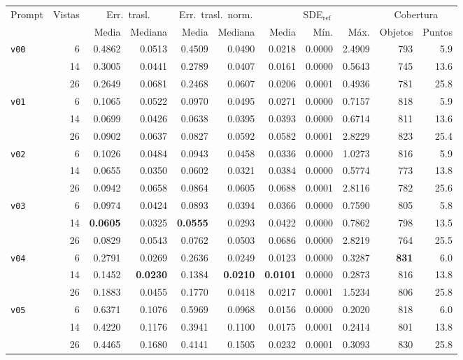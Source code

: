 \begin{table}[!h]
\vspace{2ex}

\begin{tabular*}{\textwidth}{@{\extracolsep{\fill}}lrrrrrrrrrr@{}}
\toprule
\multirow{2}{*}{Prompt} & \multirow{2}{*}{Vistas} & \multicolumn{2}{c}{Err.\ trasl.} & \multicolumn{2}{c}{Err.\ trasl.\ norm.} & \multicolumn{3}{c}{SDE$_{\mathrm{ref}}$} & \multicolumn{2}{c}{Cobertura} \\
\cmidrule(lr){3-4} \cmidrule(lr){5-6} \cmidrule(lr){7-9} \cmidrule(lr){10-11}
 &  & Media & Mediana & Media & Mediana & Media & Mín. & Máx. & Objetos & Puntos \\
\midrule
\multirow{3}{*}{\texttt{v00}} & 6 & 0.4862 & 0.0513 & 0.4509 & 0.0490 & 0.0218 & 0.0000 & 2.4909 & 793 & 5.9 \\
 & 14 & 0.3005 & 0.0441 & 0.2789 & 0.0407 & 0.0161 & 0.0000 & 0.5643 & 745 & 13.6 \\
 & 26 & 0.2649 & 0.0681 & 0.2468 & 0.0607 & 0.0206 & 0.0001 & 0.4936 & 781 & 25.8 \\
\midrule
\multirow{3}{*}{\texttt{v01}} & 6 & 0.1065 & 0.0522 & 0.0970 & 0.0495 & 0.0271 & 0.0000 & 0.7157 & 818 & 5.9 \\
 & 14 & 0.0699 & 0.0426 & 0.0638 & 0.0395 & 0.0393 & 0.0000 & 0.6714 & 811 & 13.6 \\
 & 26 & 0.0902 & 0.0637 & 0.0827 & 0.0592 & 0.0582 & 0.0001 & 2.8229 & 823 & 25.4 \\
\midrule
\multirow{3}{*}{\texttt{v02}} & 6 & 0.1026 & 0.0484 & 0.0943 & 0.0458 & 0.0336 & 0.0000 & 1.0273 & 816 & 5.9 \\
 & 14 & 0.0655 & 0.0350 & 0.0602 & 0.0321 & 0.0384 & 0.0000 & 0.5774 & 773 & 13.8 \\
 & 26 & 0.0942 & 0.0658 & 0.0864 & 0.0605 & 0.0688 & 0.0001 & 2.8116 & 782 & 25.6 \\
\midrule
\multirow{3}{*}{\texttt{v03}} & 6 & 0.0974 & 0.0424 & 0.0893 & 0.0394 & 0.0366 & 0.0000 & 0.7590 & 805 & 5.8 \\
 & 14 & \textbf{0.0605} & 0.0325 & \textbf{0.0555} & 0.0293 & 0.0422 & 0.0000 & 0.7862 & 798 & 13.5 \\
 & 26 & 0.0829 & 0.0543 & 0.0762 & 0.0503 & 0.0686 & 0.0000 & 2.8219 & 764 & 25.5 \\
\midrule
\multirow{3}{*}{\texttt{v04}} & 6 & 0.2791 & 0.0269 & 0.2636 & 0.0249 & 0.0123 & 0.0000 & 0.3287 & \textbf{831} & 6.0 \\
 & 14 & 0.1452 & \textbf{0.0230} & 0.1384 & \textbf{0.0210} & \textbf{0.0101} & 0.0000 & 0.2873 & 816 & 13.8 \\
 & 26 & 0.1883 & 0.0455 & 0.1770 & 0.0418 & 0.0217 & 0.0001 & 1.5234 & 806 & 25.8 \\
\midrule
\multirow{3}{*}{\texttt{v05}} & 6 & 0.6371 & 0.1076 & 0.5969 & 0.0968 & 0.0156 & 0.0000 & 0.2020 & 818 & 6.0 \\
 & 14 & 0.4220 & 0.1176 & 0.3941 & 0.1100 & 0.0175 & 0.0001 & 0.2414 & 801 & 13.8 \\
 & 26 & 0.4465 & 0.1680 & 0.4141 & 0.1505 & 0.0232 & 0.0001 & 0.3093 & 830 & 25.8 \\
\bottomrule
\end{tabular*}


\end{table}
